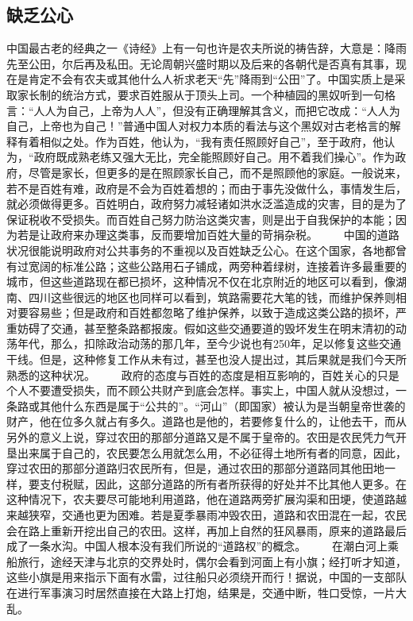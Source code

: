 \documentclass[12pt,oneside]{book}
\begin{document}
\begin{common-format}
\chapter{缺乏公心}
中国最古老的经典之一《诗经》上有一句也许是农夫所说的祷告辞，大意是：降雨先至公田，尔后再及私田。无论周朝兴盛时期以及后来的各朝代是否真有其事，现在是肯定不会有农夫或其他什么人祈求老天“先”降雨到“公田”了。中国实质上是采取家长制的统治方式，要求百姓服从于顶头上司。一个种植园的黑奴听到一句格言：“人人为自己，上帝为人人”，但没有正确理解其含义，而把它改成：“人人为自己，上帝也为自己！”普通中国人对权力本质的看法与这个黑奴对古老格言的解释有着相似之处。作为百姓，他认为，“我有责任照顾好自己”，至于政府，他认为，“政府既成熟老练又强大无比，完全能照顾好自己。用不着我们操心”。作为政府，尽管是家长，但更多的是在照顾家长自己，而不是照顾他的家庭。一般说来，若不是百姓有难，政府是不会为百姓着想的；而由于事先没做什么，事情发生后，就必须做得更多。百姓明白，政府努力减轻诸如洪水泛滥造成的灾害，目的是为了保证税收不受损失。而百姓自己努力防治这类灾害，则是出于自我保护的本能；因为若是让政府来办理这类事，反而要增加百姓大量的苛捐杂税。 
　　中国的道路状况很能说明政府对公共事务的不重视以及百姓缺乏公心。在这个国家，各地都曾有过宽阔的标准公路；这些公路用石子铺成，两旁种着绿树，连接着许多最重要的城市，但这些道路现在都已损坏，这种情况不仅在北京附近的地区可以看到，像湖南、四川这些很远的地区也同样可以看到，筑路需要花大笔的钱，而维护保养则相对要容易些；但是政府和百姓都忽略了维护保养，以致于造成这类公路的损坏，严重妨碍了交通，甚至整条路都报废。假如这些交通要道的毁坏发生在明末清初的动荡年代，那么，扣除政治动荡的那几年，至今少说也有250年，足以修复这些交通干线。但是，这种修复工作从未有过，甚至也没人提出过，其后果就是我们今天所熟悉的这种状况。 
　　政府的态度与百姓的态度是相互影响的，百姓关心的只是个人不要遭受损失，而不顾公共财产到底会怎样。事实上，中国人就从没想过，一条路或其他什么东西是属于“公共的”。“河山”（即国家）被认为是当朝皇帝世袭的财产，他在位多久就占有多久。道路也是他的，若要修复什么的，让他去干，而从另外的意义上说，穿过农田的那部分道路又是不属于皇帝的。农田是农民凭力气开垦出来属于自己的，农民要怎么用就怎么用，不必征得土地所有者的同意，因此，穿过农田的那部分道路归农民所有，但是，通过农田的那部分道路同其他田地一样，要支付税赋，因此，这部分道路的所有者所获得的好处并不比其他人更多。在这种情况下，农夫要尽可能地利用道路，他在道路两旁扩展沟渠和田埂，使道路越来越狭窄，交通也更为困难。若是夏季暴雨冲毁农田，道路和农田混在一起，农民会在路上重新开挖出自己的农田。这样，再加上自然的狂风暴雨，原来的道路最后成了一条水沟。中国人根本没有我们所说的“道路权”的概念。 
　　在潮白河上乘船旅行，途经天津与北京的交界处时，偶尔会看到河面上有小旗；经打听才知道，这些小旗是用来指示下面有水雷，过往船只必须绕开而行！据说，中国的一支部队在进行军事演习时居然直接在大路上打炮，结果是，交通中断，牲口受惊，一片大乱。 

\end{common-format}
\end{document}
